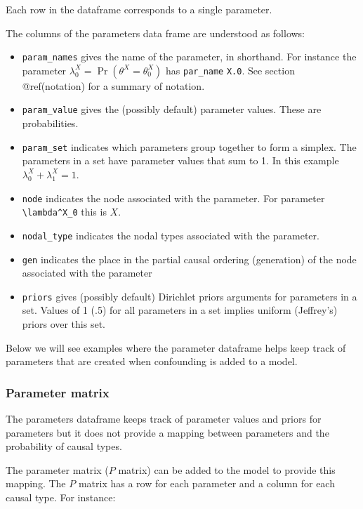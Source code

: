 \documentclass[
  article]{jss}
\providecommand{\tightlist}{%
  \setlength{\itemsep}{0pt}\setlength{\parskip}{0pt}}\usepackage{longtable,booktabs,array}
\begin{document}
Each row in the dataframe corresponds to a single parameter.

The columns of the parameters data frame are understood as follows:

\begin{itemize}
\tightlist
\item
  \texttt{param\_names} gives the name of the parameter, in shorthand.
  For instance the parameter
  \(\lambda^X_0 = \Pr(\theta^X = \theta^X_0)\) has \texttt{par\_name}
  \texttt{X.0}. See section @ref(notation) for a summary of notation.
\item
  \texttt{param\_value} gives the (possibly default) parameter values.
  These are probabilities.\\
\item
  \texttt{param\_set} indicates which parameters group together to form
  a simplex. The parameters in a set have parameter values that sum to
  1. In this example \(\lambda^X_0 + \lambda^X_1 = 1\).
\item
  \texttt{node} indicates the node associated with the parameter. For
  parameter \texttt{\textbackslash{}lambda\^{}X\_0} this is \(X\).
\item
  \texttt{nodal\_type} indicates the nodal types associated with the
  parameter.
\item
  \texttt{gen} indicates the place in the partial causal ordering
  (generation) of the node associated with the parameter
\item
  \texttt{priors} gives (possibly default) Dirichlet priors arguments
  for parameters in a set. Values of 1 (.5) for all parameters in a set
  implies uniform (Jeffrey's) priors over this set.
\end{itemize}

Below we will see examples where the parameter dataframe helps keep
track of parameters that are created when confounding is added to a
model.

\hypertarget{parameter-matrix}{%
\subsubsection{Parameter matrix}\label{parameter-matrix}}

The parameters dataframe keeps track of parameter values and priors for
parameters but it does not provide a mapping between parameters and the
probability of causal types.

The parameter matrix (\(P\) matrix) can be added to the model to provide
this mapping. The \(P\) matrix has a row for each parameter and a column
for each causal type. For instance:
\end{document}
